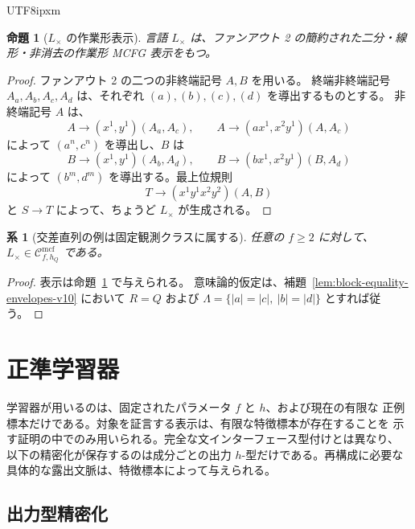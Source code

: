 \documentclass[10pt,a4paper]{article}
\newtheorem{proposition}[theorem]{命題}
\newtheorem{corollary}[theorem]{系}
\theoremstyle{remark}
\newcommand{\Cmcf}[2]{\mathcal{C}^{\mathrm{mcf}}_{#1,#2}}
\begin{document}
\begin{CJK}{UTF8}{ipxm}
\begin{proposition}[\(L_{\times}\) の作業形表示]
\label{prop:cross-serial-running-example}
言語 \(L_{\times}\) は、ファンアウト 2 の簡約された二分・線形・非消去の作業形 MCFG 表示をもつ。
\end{proposition}

\begin{proof}
ファンアウト 2 の二つの非終端記号 \(A,B\) を用いる。
終端非終端記号 \(A_a,A_b,A_c,A_d\) は、それぞれ \((a),(b),(c),(d)\) を導出するものとする。
非終端記号 \(A\) は、
\[
  A\to(x^1,y^1)(A_a,A_c),
  \qquad
  A\to(a x^1,x^2 y^1)(A,A_c)
\]
によって \((a^n,c^n)\) を導出し、\(B\) は
\[
  B\to(x^1,y^1)(A_b,A_d),
  \qquad
  B\to(b x^1,x^2 y^1)(B,A_d)
\]
によって \((b^m,d^m)\) を導出する。最上位規則
\[
  T\to(x^1y^1x^2y^2)(A,B)
\]
と \(S\to T\) によって、ちょうど \(L_{\times}\) が生成される。
\end{proof}

\begin{corollary}[交差直列の例は固定観測クラスに属する]
\label{cor:cross-serial-in-fixed-observation-class}
任意の \(f\ge2\) に対して、\(L_{\times}\in\Cmcf{f}{h_Q}\) である。
\end{corollary}

\begin{proof}
表示は命題~\ref{prop:cross-serial-running-example} で与えられる。
意味論的仮定は、補題~\ref{lem:block-equality-envelopes-v10} において
\(R=Q\) および \(\Lambda=\{|a|=|c|,\ |b|=|d|\}\) とすれば従う。
\end{proof}

\section{正準学習器}
\label{sec:learner}

学習器が用いるのは、固定されたパラメータ \(f\) と \(h\)、および現在の有限な
正例標本だけである。対象を証言する表示は、有限な特徴標本が存在することを
示す証明の中でのみ用いられる。完全な文インターフェース型付けとは異なり、
以下の精密化が保存するのは成分ごとの出力 \(h\)-型だけである。再構成に必要な
具体的な露出文脈は、特徴標本によって与えられる。

\subsection{出力型精密化}
\label{sec:refinement}


\end{CJK}
\end{document}
